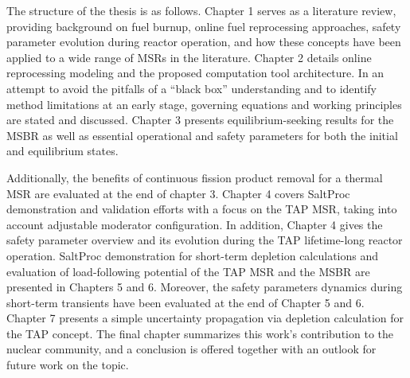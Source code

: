 The structure of the thesis is as follows. Chapter 1 serves as a literature 
review, providing background on fuel burnup, online fuel reprocessing  
approaches, safety parameter evolution during reactor operation, and how these 
concepts have been applied to a wide range of \glspl{MSR} in the literature. 
Chapter 2 details online reprocessing modeling and the proposed computation 
tool architecture. In an attempt to avoid the pitfalls of a ``black box''  
understanding and to identify method limitations at an early stage, governing 
equations and working principles are stated and discussed. Chapter 3 presents 
equilibrium-seeking results for the \gls{MSBR} as well as essential 
operational and safety parameters for both the initial and equilibrium states.

Additionally, the benefits of continuous fission product removal for a thermal 
\gls{MSR} are evaluated at the end of chapter 3. Chapter 4 covers SaltProc 
demonstration and validation efforts with a focus on the \gls{TAP} \gls{MSR},  
taking into account adjustable moderator configuration. In addition, Chapter 
4 gives the safety parameter overview and its evolution during the \gls{TAP} 
lifetime-long reactor operation. SaltProc demonstration for short-term 
depletion calculations and evaluation of load-following potential of the 
\gls{TAP} \gls{MSR} and the \gls{MSBR} are presented in Chapters 5 and 6.
Moreover, the safety parameters dynamics during short-term transients have 
been evaluated at the end of Chapter 5 and 6. Chapter 7 presents a simple 
uncertainty propagation via depletion calculation for the \gls{TAP} concept.
The final chapter summarizes this work's contribution to the nuclear 
community, and a conclusion is offered together with an outlook for future 
work on the 
topic.